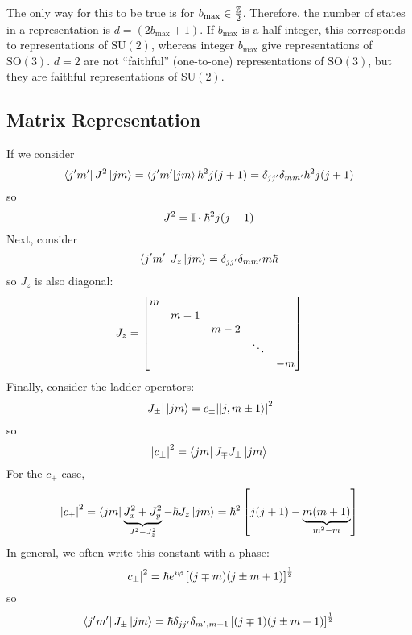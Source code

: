 \documentclass[a4paper,twoside,master.tex]{subfiles}
\begin{document}
The only way for this to be true is for $ b_{\text{max}} \in \frac{\mathbb{Z}}{2} $. Therefore, the number of states in a representation is $ d = (2 b_{\text{max}} + 1) $. If $ b_{\text{max}} $ is a half-integer, this corresponds to representations of $\text{SU}(2)$, whereas integer $ b_{\text{max}} $ give representations of $\text{SO}(3)$. $ d=2 $ are not ``faithful'' (one-to-one) representations of $\text{SO}(3)$, but they are faithful representations of $\text{SU}(2)$.

\subsection{Matrix Representation}
\label{sub:matrix_representation}

If we consider
\begin{equation}
    \bra{j'm'} J^2\ket{jm} =\bra{j'm'}\ket{jm} \hbar^2 j(j+1) = \delta_{jj'} \delta_{mm'} \hbar^2 j(j+1)
\end{equation}
so
\begin{equation}
    J^2 = \mathbb{I} \vdot \hbar^2 j(j+1)
\end{equation}
Next, consider
\begin{equation}
    \bra{j'm'} J_z\ket{jm} = \delta_{jj'} \delta_{mm'} m \hbar
\end{equation}
so $ J_z $ is also diagonal:
\begin{equation}
    J_z = \mqty[\dmat{m,m-1,m-2,\ddots,-m}]
\end{equation}
Finally, consider the ladder operators:
\begin{equation}
    \abs{J_{\pm}}\ket{jm} = c_{\pm} \abs{\ket{j,m\pm1}}^2
\end{equation}
so
\begin{equation}
    \abs{c_{\pm}}^2 =\bra{jm} J_{\mp} J_{\pm}\ket{jm}
\end{equation}
For the $ c_+ $ case,
\begin{equation}
    \abs{c_+}^2 =\bra{jm} \underbrace{J_x^2 + J_y^2}_{J^2 - J_z^2} - \hbar J_z\ket{jm} = \hbar^2 \left[ j(j+1) - \underbrace{m(m+1)}_{m^2 - m} \right]
\end{equation}
In general, we often write this constant with a phase:
\begin{equation}
    \abs{c_{\pm}}^2 = \hbar e^{\imath \varphi} \left[ (j\mp m)(j\pm m+1) \right]^{\frac{1}{2}}
\end{equation}
so
\begin{equation}
    \bra{j'm'} J_{\pm}\ket{jm} = \hbar \delta_{jj'} \delta_{m',m+1} \left[ (j\mp 1)(j \pm m + 1) \right]^{\frac{1}{2}}
\end{equation}
\end{document}
